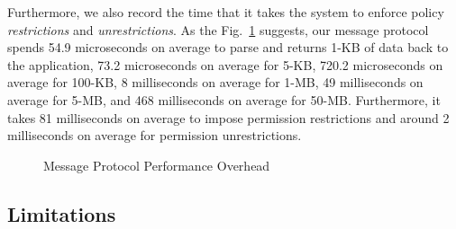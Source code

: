 Furthermore, we also record the time that it takes the system to
enforce policy \textit{restrictions} and \textit{unrestrictions}.  As
the Fig.~\ref{fig:performance} suggests, our message 
protocol spends 54.9 microseconds on average to parse and returns 1-KB of
data back to the application, 73.2 microseconds on average for 5-KB, 
720.2 microseconds on average for 100-KB, 8 milliseconds on average
for 1-MB, 49 milliseconds on average for 5-MB, and 468 milliseconds
on average for 50-MB.  Furthermore, it takes 81 milliseconds on average
to impose permission restrictions and around 2 milliseconds on average
for permission unrestrictions.

\begin{figure}[ht]
\centering
{}
\caption{Message Protocol Performance Overhead}
\label{fig:performance}
\end{figure}

\subsection{Limitations}


